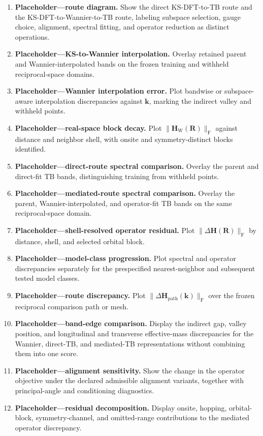 \begin{enumerate}
    \raggedright
    \item \textbf{Placeholder---route diagram.} Show the direct
          KS-DFT-to-TB route and the KS-DFT-to-Wannier-to-TB route, labeling
          subspace selection, gauge choice, alignment, spectral fitting, and
          operator reduction as distinct operations.
    \item \textbf{Placeholder---KS-to-Wannier interpolation.} Overlay retained
          parent and Wannier-interpolated bands on the frozen training and
          withheld reciprocal-space domains.
    \item \textbf{Placeholder---Wannier interpolation error.} Plot bandwise or
          subspace-aware interpolation discrepancies against $\mathbf k$,
          marking the indirect valley and withheld points.
    \item \textbf{Placeholder---real-space block decay.} Plot
          $\lVert\mathbf H_{\mathrm W}(\mathbf R)\rVert_{\mathrm F}$ against
          distance and neighbor shell, with onsite and symmetry-distinct blocks
          identified.
    \item \textbf{Placeholder---direct-route spectral comparison.} Overlay the
          parent and direct-fit TB bands, distinguishing training from withheld
          points.
    \item \textbf{Placeholder---mediated-route spectral comparison.} Overlay
          the parent, Wannier-interpolated, and operator-fit TB bands on the
          same reciprocal-space domain.
    \item \textbf{Placeholder---shell-resolved operator residual.} Plot
          $\lVert\Delta\mathbf H(\mathbf R)\rVert_{\mathrm F}$ by distance,
          shell, and selected orbital block.
    \item \textbf{Placeholder---model-class progression.} Plot spectral and
          operator discrepancies separately for the prespecified
          nearest-neighbor and subsequent tested model classes.
    \item \textbf{Placeholder---route discrepancy.} Plot
          $\lVert\Delta\mathbf H_{\mathrm{path}}(\mathbf k)\rVert_{\mathrm F}$
          over the frozen reciprocal comparison path or mesh.
    \item \textbf{Placeholder---band-edge comparison.} Display the indirect
          gap, valley position, and longitudinal and transverse effective-mass
          discrepancies for the Wannier, direct-TB, and mediated-TB
          representations without combining them into one score.
    \item \textbf{Placeholder---alignment sensitivity.} Show the change in the
          operator objective under the declared admissible alignment variants,
          together with principal-angle and conditioning diagnostics.
    \item \textbf{Placeholder---residual decomposition.} Display onsite,
          hopping, orbital-block, symmetry-channel, and omitted-range
          contributions to the mediated operator discrepancy.
\end{enumerate}
